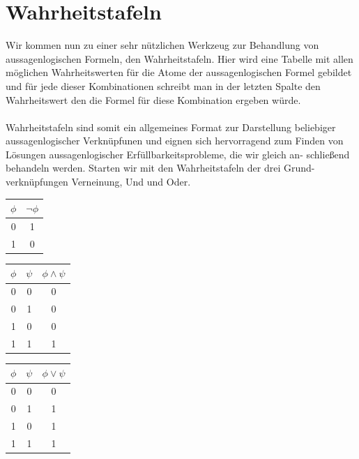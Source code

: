 \documentclass[11pt,a4paper,leqno]{report}
\numberwithin{equation}{chapter}
\begin{document}
\section{Wahrheitstafeln}
Wir kommen nun zu einer sehr n\"utzlichen Werkzeug zur Behandlung von aussagenlogischen Formeln, den Wahrheitstafeln. Hier wird eine Tabelle mit allen m\"oglichen Wahrheitswerten f\"ur die Atome der aussagenlogischen Formel gebildet und f\"ur jede dieser Kombinationen schreibt man in der letzten Spalte den Wahrheitswert den die Formel f\"ur diese Kombination ergeben w\"urde.\\
\\
Wahrheitstafeln sind somit ein allgemeines Format zur Darstellung beliebiger aussagenlogischer Verkn\"upfunen und eignen sich hervorragend zum Finden von L\"osungen aussagenlogischer Erf\"ullbarkeitsprobleme, die wir gleich an- schlie\ss{}end behandeln werden.
Starten wir mit den Wahrheitstafeln der drei Grund- verkn\"upfungen Verneinung, Und und Oder.
\begin{center}
\begin{minipage}{1.0in}
	\begin{tabular}{|c|c|}
	$\phi$ & $\neg\phi$\\
	\hline
	0 & 1\\
	1 & 0\\
	\end{tabular}
\end{minipage}
\begin{minipage}{1.5in}
	\begin{tabular}{|c c|c|}
	$\phi$ & $\psi$ & $\phi \wedge \psi$\\
	\hline
	0 & 0 & 0\\
	0 & 1 & 0\\
	1 & 0 & 0\\
	1 & 1 & 1\\
	\end{tabular}  
\end{minipage}
\begin{minipage}{1.5in}
	\begin{tabular}{|c c|c|}
	$\phi$ & $\psi$ & $\phi \vee \psi$\\
	\hline
	0 & 0 & 0\\
	0 & 1 & 1\\
	1 & 0 & 1\\
	1 & 1 & 1\\
	\end{tabular}  
\end{minipage}
\end{center}
\end{document}
